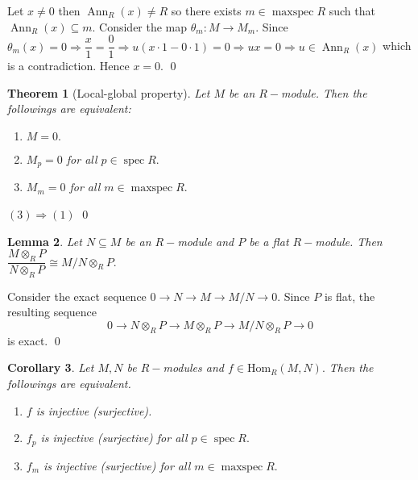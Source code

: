 \documentclass[11pt]{amsart}
\newtheorem{theorem}{Theorem}[section]
\newtheorem{corollary}[theorem]{Corollary}%
\newtheorem{lemma}[theorem]{Lemma}%
\newcommand{\Hom}[1]{\text{Hom}_R\left(#1\right)}
\DeclareMathOperator{\spec}{\text{spec}}
\DeclareMathOperator{\mspec}{\text{maxspec}}
\begin{document}
\proof Let $x\neq 0$ then $\operatorname{Ann}_R(x)\neq R$ so there exists $m\in \mspec R$ such that $\operatorname{Ann}_R (x)\subseteq m.$ Consider the map $\theta_m:M\to M_m$. Since $\theta_m(x)=0 \Rightarrow \dfrac{x}{1}=\dfrac{0}{1}\Rightarrow u(x\cdot 1-0\cdot 1)=0 \Rightarrow ux=0 \Rightarrow u\in \operatorname{Ann}_R(x)$ which is a contradiction. Hence $x=0.$ \qed

\begin{theorem}[Local-global property]

Let $M$ be an $R-$module. Then the followings are equivalent:

\begin{enumerate}

\item $M=0.$

\item $M_p=0$ for all $p\in\spec R.$

\item $M_m=0$ for all $m\in\mspec R.$

\end{enumerate}

\end{theorem}

\proof $(3)\Rightarrow (1)$ \qed


\begin{lemma}

Let $N\subseteq M$ be an $R-$module and $P$ be a flat $R-$module. Then $\dfrac{M\otimes_R P}{N\otimes_R P}\cong M/N\otimes_R P.$

\end{lemma}

\proof Consider the exact sequence $0\to N\to M\to M/N\to 0$. Since $P$ is flat, the resulting sequence $$0\to N\otimes_R P\to M\otimes_R P\to M/N\otimes_R P\to 0$$ is exact. \qed

\begin{corollary}

Let $M,N$ be $R-$modules and $f\in\Hom{M,N}.$ Then the followings are equivalent. 

\begin{enumerate}

\item $f$ is injective (surjective).

\item $f_p$ is injective (surjective) for all $p\in\spec R.$

\item $f_m$ is injective (surjective) for all $m\in\mspec R.$

\end{enumerate}

\end{corollary}
\end{document}
